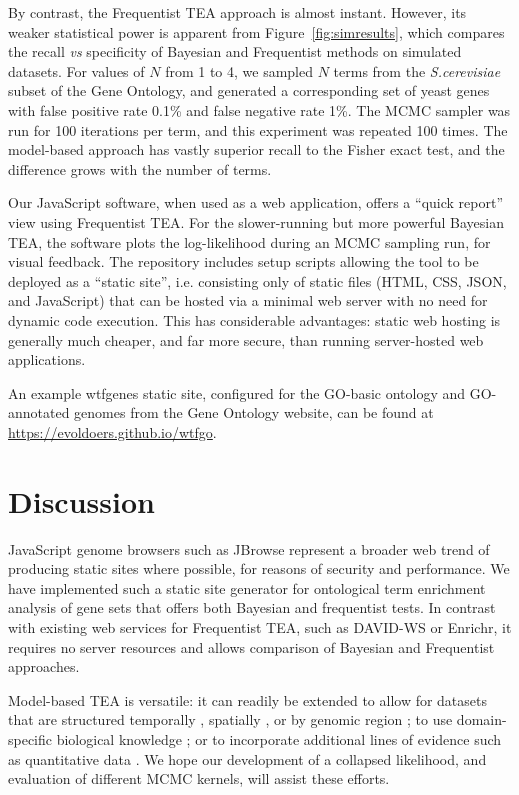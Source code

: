 By contrast, the Frequentist TEA approach is almost instant.
However, its weaker statistical power is apparent from Figure~\ref{fig:simresults},
which compares the recall {\em vs} specificity of Bayesian and Frequentist methods
on simulated datasets. For values of $N$ from 1 to 4, we sampled $N$ terms
from the {\em S.cerevisiae} subset of the Gene Ontology,
and generated a corresponding set of yeast genes with false positive rate 0.1\% and false negative rate 1\%.
The MCMC sampler was run for 100 iterations per term, and this experiment was repeated 100 times.
The model-based approach has vastly superior recall to the Fisher exact test, and the difference
grows with the number of terms.

Our JavaScript software, when used as a web application,
offers a ``quick report'' view using Frequentist TEA.
For the slower-running but more powerful Bayesian TEA, the software plots the log-likelihood during an MCMC sampling run, for visual feedback.
The repository includes setup scripts allowing the tool to be deployed as a ``static site'',
i.e. consisting only of static files (HTML, CSS, JSON, and JavaScript) that can be hosted via a minimal web server with no need for dynamic code execution.
This has considerable advantages: static web hosting is generally much cheaper, and far more secure, than running server-hosted web applications.

An example wtfgenes static site, configured for the GO-basic ontology and GO-annotated genomes from the Gene Ontology website,
can be found at \url{https://evoldoers.github.io/wtfgo}.

\section*{Discussion}

JavaScript genome browsers such as JBrowse \citep{pmid27072794}
represent a broader web trend of producing static sites where possible, for reasons of security and performance.
We have implemented such a static site generator for ontological term enrichment analysis of gene sets that offers both Bayesian and frequentist tests.
In contrast with existing web services for Frequentist TEA, such as DAVID-WS or Enrichr,
it requires no server resources and allows comparison of Bayesian and Frequentist approaches.

Model-based TEA is versatile: it can readily be extended
to allow for datasets that are structured
temporally \citep{pmid26111374},
spatially \citep{pmid26877824},
or by genomic region \citep{pmid20436461};
to use domain-specific biological knowledge \citep{pmid24675718};
or to incorporate additional lines of evidence such as quantitative data \citep{pmid21599902}.
We hope our development of a collapsed likelihood, and evaluation of different MCMC kernels, will assist these efforts.

